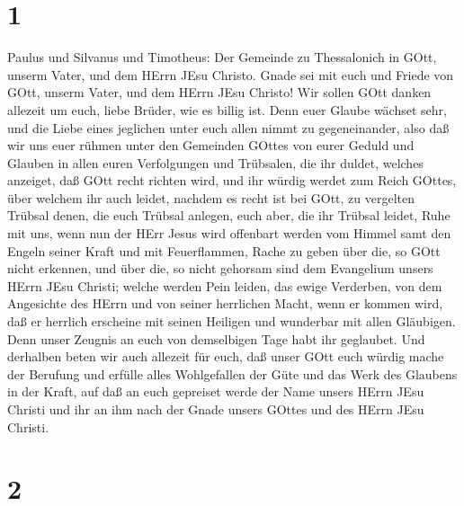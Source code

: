\hypertarget{section}{%
\section{1}\label{section}}

 Paulus und Silvanus und Timotheus: Der Gemeinde zu
Thessalonich in GOtt, unserm Vater, und dem HErrn JEsu Christo.
 Gnade sei mit euch und Friede von GOtt, unserm Vater, und
dem HErrn JEsu Christo!  Wir sollen GOtt danken allezeit um
euch, liebe Brüder, wie es billig ist. Denn euer Glaube wächset sehr,
und die Liebe eines jeglichen unter euch allen nimmt zu gegeneinander,
 also daß wir uns euer rühmen unter den Gemeinden GOttes von
eurer Geduld und Glauben in allen euren Verfolgungen und Trübsalen, die
ihr duldet,  welches anzeiget, daß GOtt recht richten wird,
und ihr würdig werdet zum Reich GOttes, über welchem ihr auch leidet,
 nachdem es recht ist bei GOtt, zu vergelten Trübsal denen,
die euch Trübsal anlegen,  euch aber, die ihr Trübsal
leidet, Ruhe mit uns, wenn nun der HErr Jesus wird offenbart werden vom
Himmel samt den Engeln seiner Kraft  und mit Feuerflammen,
Rache zu geben über die, so GOtt nicht erkennen, und über die, so nicht
gehorsam sind dem Evangelium unsers HErrn JEsu Christi; 
welche werden Pein leiden, das ewige Verderben, von dem Angesichte des
HErrn und von seiner herrlichen Macht,  wenn er kommen
wird, daß er herrlich erscheine mit seinen Heiligen und wunderbar mit
allen Gläubigen. Denn unser Zeugnis an euch von demselbigen Tage habt
ihr geglaubet.  Und derhalben beten wir auch allezeit für
euch, daß unser GOtt euch würdig mache der Berufung und erfülle alles
Wohlgefallen der Güte und das Werk des Glaubens in der Kraft,
 auf daß an euch gepreiset werde der Name unsers HErrn JEsu
Christi und ihr an ihm nach der Gnade unsers GOttes und des HErrn JEsu
Christi.

\hypertarget{section-1}{%
\section{2}\label{section-1}}

